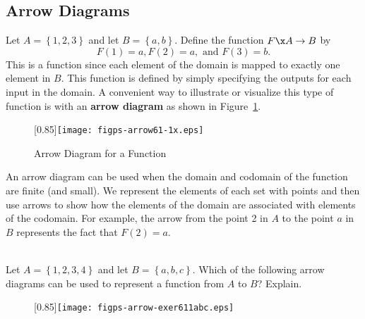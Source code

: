 \subsection*{Arrow Diagrams}
Let  $A = \left\{ {1, 2, 3} \right\}$  and let  $B = \left\{ {a, b} \right\}$.  Define the function  $F\x A \to B$ by  
\[
F( 1 ) = a, F( 2 ) = a, \text{ and }  F( 3 ) = b.
\]
%
This is a function since each element of the domain is mapped to exactly one element in  $B$.  This function is defined by simply specifying the outputs for each input in the domain.  
A convenient way to illustrate or visualize this type of function is with an \textbf{arrow diagram}
%
 as shown in Figure~\ref{fig:arrow61-1}.
\begin{figure}[h]
\begin{center}
\scalebox{0.85}[0.85]{\texttt{[image: figps-arrow61-1x.eps]}} 
\caption{Arrow Diagram for a Function} \label{fig:arrow61-1}
\end{center}
\end{figure}

An arrow diagram can be used when the domain and codomain of the function are finite (and small).  We represent the elements of each set with points and then use arrows to show how the elements of the domain are associated with elements of the codomain.  For example, the arrow from the point  2  in  $A$  to the point  $a$  in  $B$  represents the fact that  $F( 2 ) = a$.

\begin{prog} \label{pr:arrow} \hfill \\
Let  $A = \left\{ {1, 2, 3, 4} \right\}$ and let  $B = \left\{ {a, b, c} \right\}$.  Which of the following arrow diagrams can be used to represent a function from  $A$  to  $B$?  Explain. \label{exer:sec61-1}

\begin{figure}[h]
\begin{center}
\scalebox{0.85}[0.85]{\texttt{[image: figps-arrow-exer611abc.eps]}} 
\end{center}
\end{figure}

\end{prog}

